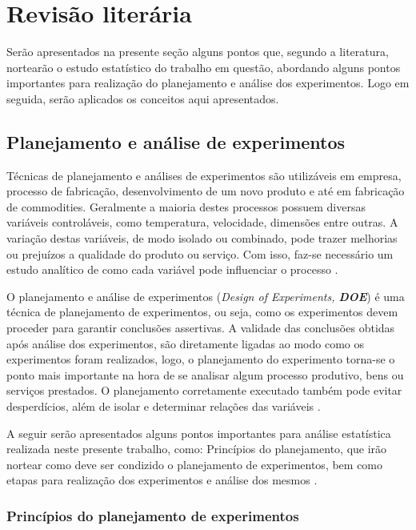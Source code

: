 \section{Revisão literária}

Serão apresentados na presente seção alguns pontos que, segundo a literatura, nortearão o estudo estatístico do trabalho em questão, abordando alguns pontos importantes para realização do planejamento e análise dos experimentos. Logo em seguida, serão aplicados os conceitos aqui apresentados.


\subsection{Planejamento e análise de experimentos}

Técnicas de planejamento e análises de experimentos são utilizáveis em empresa, processo de fabricação, desenvolvimento de um novo produto e até em fabricação de commodities. Geralmente a maioria destes processos possuem diversas variáveis controláveis, como temperatura, velocidade, dimensões entre outras. A variação destas variáveis, de modo isolado ou combinado, pode trazer melhorias ou prejuízos a qualidade do produto ou serviço. Com isso, faz-se necessário um estudo analítico de como cada variável pode influenciar o processo \cite{1}. 

O planejamento e análise de experimentos (\textit{Design of Experiments, \textbf{DOE}}) é uma técnica de planejamento de experimentos, ou seja, como os experimentos devem proceder para garantir conclusões assertivas. A validade das conclusões obtidas após análise dos experimentos, são diretamente ligadas ao modo como os experimentos foram realizados, logo, o planejamento do experimento torna-se o ponto mais importante na hora de se analisar algum processo produtivo, bens ou serviços prestados. O planejamento corretamente executado também pode evitar desperdícios, além de isolar e determinar relações das variáveis \cite{1}.

A seguir serão apresentados alguns pontos importantes para análise estatística realizada neste presente trabalho, como: Princípios do planejamento, que irão nortear como deve ser condizido o planejamento de experimentos, bem como etapas para realização dos experimentos e análise dos mesmos \cite{2}.


\subsubsection{Princípios do planejamento de experimentos}

